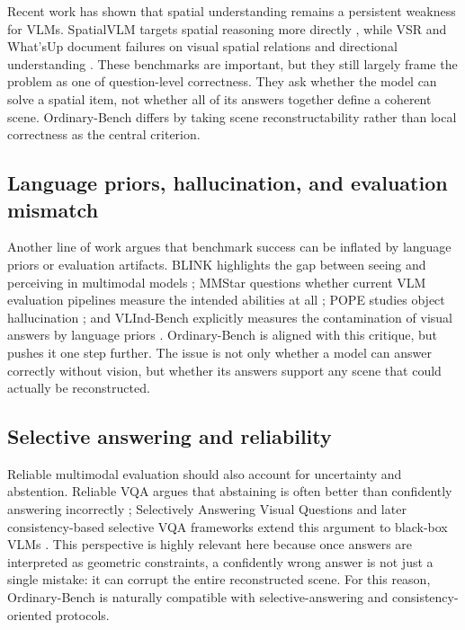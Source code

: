 Recent work has shown that spatial understanding remains a persistent weakness for VLMs. SpatialVLM targets spatial reasoning more directly \cite{chen2024spatialvlm}, while VSR and What'sUp document failures on visual spatial relations and directional understanding \cite{liu2023vsr,kamath2023whatsup}. These benchmarks are important, but they still largely frame the problem as one of question-level correctness. They ask whether the model can solve a spatial item, not whether all of its answers together define a coherent scene. Ordinary-Bench differs by taking scene reconstructability rather than local correctness as the central criterion.

\subsection{Language priors, hallucination, and evaluation mismatch}

Another line of work argues that benchmark success can be inflated by language priors or evaluation artifacts. BLINK highlights the gap between seeing and perceiving in multimodal models \cite{fu2024blink}; MMStar questions whether current VLM evaluation pipelines measure the intended abilities at all \cite{chen2024mmstar}; POPE studies object hallucination \cite{li2023pope}; and VLInd-Bench explicitly measures the contamination of visual answers by language priors \cite{lee2025vlind}. Ordinary-Bench is aligned with this critique, but pushes it one step further. The issue is not only whether a model can answer correctly without vision, but whether its answers support any scene that could actually be reconstructed.

\subsection{Selective answering and reliability}

Reliable multimodal evaluation should also account for uncertainty and abstention. Reliable VQA argues that abstaining is often better than confidently answering incorrectly \cite{whitehead2022reliablevqa}; Selectively Answering Visual Questions and later consistency-based selective VQA frameworks extend this argument to black-box VLMs \cite{eisenschlos2024selectivevqa,khan2024consistency}. This perspective is highly relevant here because once answers are interpreted as geometric constraints, a confidently wrong answer is not just a single mistake: it can corrupt the entire reconstructed scene. For this reason, Ordinary-Bench is naturally compatible with selective-answering and consistency-oriented protocols.

